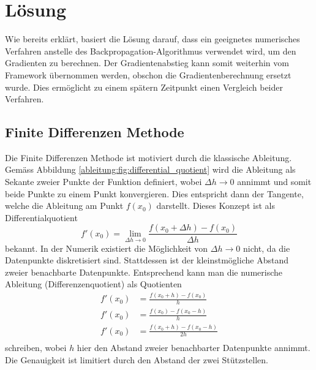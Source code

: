 %
%
%
\section{Lösung
\label{ableitung:section:loesung}}
Wie bereits erklärt, basiert die Lösung darauf, dass ein geeignetes numerisches Verfahren anstelle des Backpropagation-Algorithmus verwendet wird, um den Gradienten zu berechnen. Der Gradientenabstieg kann somit weiterhin vom Framework übernommen werden, obschon die Gradientenberechnung ersetzt wurde. Dies ermöglicht zu einem spätern Zeitpunkt einen Vergleich beider Verfahren.
\subsection{Finite Differenzen Methode}
Die Finite Differenzen Methode ist motiviert durch die klassische Ableitung. Gemäss Abbildung \ref{ableitung:fig:differential_quotient} wird die Ableitung als Sekante zweier Punkte der Funktion definiert, wobei $\Delta h \rightarrow 0$ annimmt und somit beide Punkte zu einem Punkt konvergieren. Dies entspricht dann der Tangente, welche die Ableitung am Punkt $f(x_0)$ darstellt.
Dieses Konzept ist als Differentialquotient
\begin{equation}
f'(x_0) = \lim_{{\Delta h} \rightarrow 0} \frac{f(x_0+\Delta h) - f(x_0)}{\Delta h}
\label{ableitung:equations:differentialquotient}
\end{equation}
bekannt. 
In der Numerik existiert die Möglichkeit von $\Delta h \rightarrow 0$ nicht, da die Datenpunkte diskretisiert sind. Stattdessen ist der kleinstmögliche Abstand zweier benachbarte Datenpunkte. Entsprechend kann man die numerische Ableitung (Differenzenquotient) als Quotienten
\begin{equation}
\begin{split}
f'(x_0) &= \frac{f(x_0 + h) - f(x_0)}{h} \\
f'(x_0) &= \frac{f(x_0) - f(x_0 - h)}{h} \\
f'(x_0) &= \frac{f(x_0 + h) - f(x_0 - h)}{2h} \\
\end{split}
\label{ableitung:equations:differenzenquotient}
\end{equation}
schreiben, wobei $h$ hier den Abstand zweier benachbarter Datenpunkte annimmt. Die Genauigkeit ist limitiert durch den Abstand der zwei Stützstellen.
